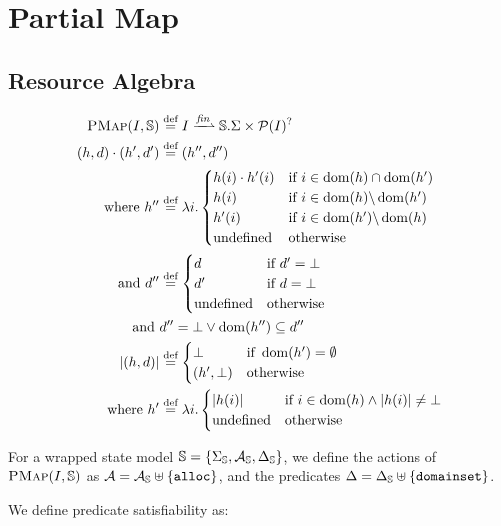 \section{Partial Map}

\subsection{Resource Algebra}

\begin{align*}
	\PMap(I,\mmdl) &\defeq I \finmap \mmdl.\Sigma \times \pset(I)^?\\
	(h,d)\cdot (h',d') &\defeq (h'', d'') \\
	\text{where } h''&\defeq \lambda i.\begin{cases}
		h(i)\cdot h'(i)&\If~i\in \dom(h)\cap\dom(h')\\
		h(i) &\If~i\in \dom(h) \backslash \dom(h')\\
		h'(i) &\If~i\in \dom(h') \backslash \dom(h)\\
		\text{undefined}&\Otherwise
	\end{cases}\\
	\text{and }d''&\defeq\begin{cases}
		d&\If~d'=\bot\\
		d'&\If~d=\bot\\
		\text{undefined}&\Otherwise
	\end{cases}\\
	\text{and }& d'' = \bot \lor \dom(h'')\subseteq d''\\
	|(h, d)| &\defeq \begin{cases}
		\bot &\If~\dom(h')=\emptyset\\
		(h', \bot) &\Otherwise
	\end{cases}\\
	\text{where }h'&\defeq \lambda i.\begin{cases}
		|h(i)| &\If~ i\in\dom(h) \land |h(i)| \neq \bot\\
		\text{undefined} &\Otherwise
	\end{cases}
\end{align*}

For a wrapped state model $\mathbb S=\{\Sigma_{\mathbb S},{\cal{A}}_{\mathbb S},\Delta_{\mathbb S}\}$, we define the actions of $\textsc{PMap}(I,\mathbb S)$ as ${\cal{A}}={\cal{A}}_{\mathbb S} \uplus \{\texttt{alloc}\}$, and the predicates $\Delta=\Delta_{\mathbb S}\uplus\{\texttt{domainset}\}$.
  
We define predicate satisfiability as:

